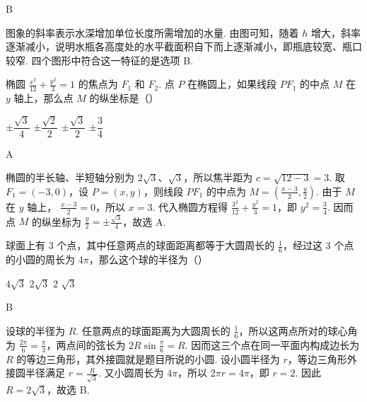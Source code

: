 \begin{answer}
B
\end{answer}

\begin{solution}
图象的斜率表示水深增加单位长度所需增加的水量. 由图可知，随着 \(h\) 增大，斜率逐渐减小，说明水瓶各高度处的水平截面积自下而上逐渐减小，即瓶底较宽、瓶口较窄. 四个图形中符合这一特征的是选项 B.
\end{solution}

\begin{problem}
椭圆 \(\frac{x^2}{12} + \frac{y^2}{3} = 1\) 的焦点为 \(F_1\) 和 \(F_2\). 点 \(P\) 在椭圆上，如果线段 \(PF_1\) 的中点 \(M\) 在 \(y\) 轴上，那么点 \(M\) 的纵坐标是（\quad）

\choices
    {\(\pm\dfrac{\sqrt{3}}{4}\)}
    {\(\pm\dfrac{\sqrt{2}}{2}\)}
    {\(\pm\dfrac{\sqrt{3}}{2}\)}
    {\(\pm\dfrac{3}{4}\)}
\end{problem}

\begin{answer}
A
\end{answer}

\begin{solution}
椭圆的半长轴、半短轴分别为 \(2\sqrt{3}\)、\(\sqrt{3}\)，所以焦半距为
\(c=\sqrt{12-3}=3\). 取 \(F_1=(-3,0)\)，设 \(P=(x,y)\)，则线段 \(PF_1\) 的中点为
\(M=\left(\frac{x-3}{2},\frac{y}{2}\right)\). 由于 \(M\) 在 \(y\) 轴上，
\(\frac{x-3}{2}=0\)，所以 \(x=3\). 代入椭圆方程得
\(\frac{3^2}{12}+\frac{y^2}{3}=1\)，即 \(y^2=\frac{3}{4}\). 因而点 \(M\) 的纵坐标为
\(\frac{y}{2}=\pm\frac{\sqrt{3}}{4}\)，故选 A.
\end{solution}

\begin{problem}
球面上有 \(3\) 个点，其中任意两点的球面距离都等于大圆周长的 \(\frac{1}{6}\)，经过这 \(3\) 个点的小圆的周长为 \(4\pi\)，那么这个球的半径为（\quad）

\choices
    {\(4\sqrt{3}\)}
    {\(2\sqrt{3}\)}
    {\(2\)}
    {\(\sqrt{3}\)}
\end{problem}

\begin{answer}
B
\end{answer}

\begin{solution}
设球的半径为 \(R\). 任意两点的球面距离为大圆周长的 \(\frac{1}{6}\)，所以这两点所对的球心角为 \(\frac{2\pi}{6}=\frac{\pi}{3}\)，两点间的弦长为 \(2R\sin\frac{\pi}{6}=R\). 因而这三个点在同一平面内构成边长为 \(R\) 的等边三角形，其外接圆就是题目所说的小圆. 设小圆半径为 \(r\)，等边三角形外接圆半径满足 \(r=\frac{R}{\sqrt{3}}\). 又小圆周长为 \(4\pi\)，所以 \(2\pi r=4\pi\)，即 \(r=2\). 因此 \(R=2\sqrt{3}\)，故选 B.
\end{solution}

